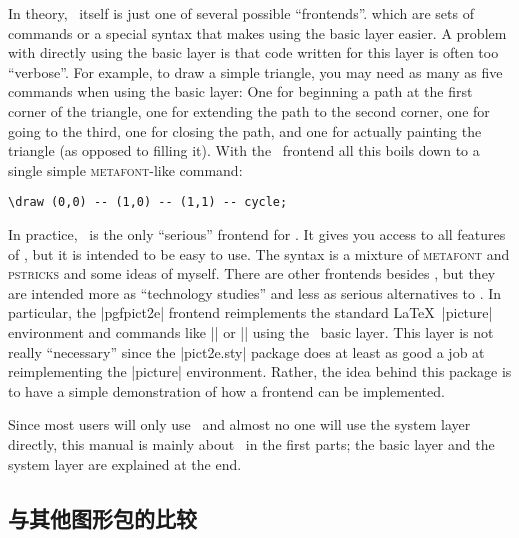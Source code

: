 In theory, \tikzname\ itself is just one of several possible ``frontends''.
which are sets of commands or a special syntax that makes using the basic layer
easier. A problem with directly using the basic layer is that code written for
this layer is often too ``verbose''. For example, to draw a simple triangle,
you may need as many as five commands when using the basic layer: One for
beginning a path at the first corner of the triangle, one for extending the
path to the second corner, one for going to the third, one for closing the
path, and one for actually painting the triangle (as opposed to filling it).
With the \tikzname\ frontend all this boils down to a single simple
\textsc{metafont}-like command:
%
\begin{verbatim}
\draw (0,0) -- (1,0) -- (1,1) -- cycle;
\end{verbatim}

In practice, \tikzname\ is the only ``serious'' frontend for \pgfname. It gives
you access to all features of \pgfname, but it is intended to be easy to use.
The syntax is a mixture of \textsc{metafont} and \textsc{pstricks} and some
ideas of myself. There are other frontends besides \tikzname, but they are intended
more as ``technology studies'' and less as serious alternatives to
\tikzname. In particular, the |pgfpict2e| frontend   reimplements the standard
\LaTeX\ |{picture}|  environment and commands like |\line| or |\vector| using
the \pgfname\ basic layer. This layer is not really ``necessary'' since the
|pict2e.sty| package does at least as good a job at reimplementing the
|{picture}| environment. Rather, the idea behind this package is to have a
simple demonstration of how a frontend can be implemented.

Since most users will only use \tikzname\ and almost no one will use the system
layer directly, this manual is mainly about \tikzname\ in the first parts; the
basic layer and the system layer are explained at the end.


\subsection{与其他图形包的比较}

